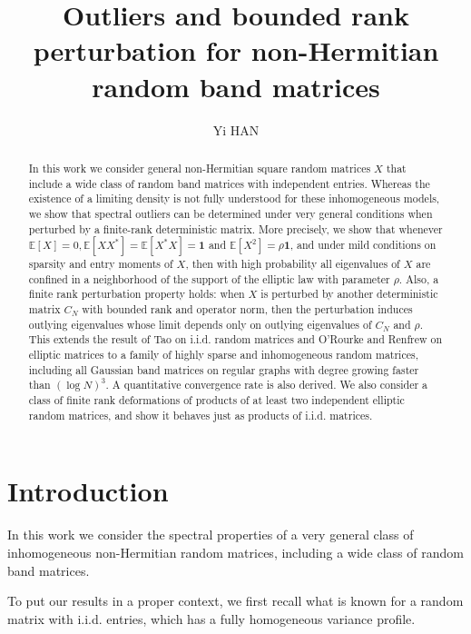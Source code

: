 \documentclass[11pt,reqno]{amsart}
\title[Non-Hermitian band matrices]{Outliers and bounded rank perturbation for non-Hermitian random band matrices}
\author{Yi HAN}
\theoremstyle{plain}
\theoremstyle{remark}
\numberwithin{equation}{section}
\begin{document}
\begin{abstract}


In this work we consider general non-Hermitian square random matrices $X$ 
that include a wide class of random band matrices with independent entries. Whereas the existence of a limiting density is not fully understood for these inhomogeneous models, we show that spectral outliers can be determined under very general conditions when perturbed by a finite-rank deterministic matrix. More precisely, we show that whenever $\mathbb{E}[X]=0,\mathbb{E}[XX^*]=\mathbb{E}[X^*X]=\mathbf{1}$ and $\mathbb{E}[X^2]=\rho\mathbf{1}$, and under mild conditions on sparsity and entry moments of $X$, then with high probability all eigenvalues of $X$ are confined in a neighborhood of the support of the elliptic law with parameter $\rho$. Also, a finite rank perturbation property holds: when $X$ is perturbed by another deterministic matrix $C_N$ with bounded rank and operator norm, then the perturbation induces outlying eigenvalues whose limit depends only on outlying eigenvalues of $C_N$ and $\rho$. This extends the result of Tao \cite{tao2013outliers} on i.i.d. random matrices and O’Rourke and Renfrew on elliptic matrices \cite{article1221} to a family of highly sparse and inhomogeneous random matrices, including all Gaussian band matrices on regular graphs with degree growing faster than $(\log N)^3$. A quantitative convergence rate is also derived. We also consider a class of finite rank deformations of products of at least two independent elliptic random matrices, and show it behaves just as products of i.i.d. matrices.



\end{abstract}

\maketitle


\section{Introduction}

In this work we consider the spectral properties of a very general class of inhomogeneous non-Hermitian random matrices, including a wide class of random band matrices. 


To put our results in a proper context, we first recall what is known for a random matrix with i.i.d. entries, which has a fully homogeneous variance profile.
\end{document}
